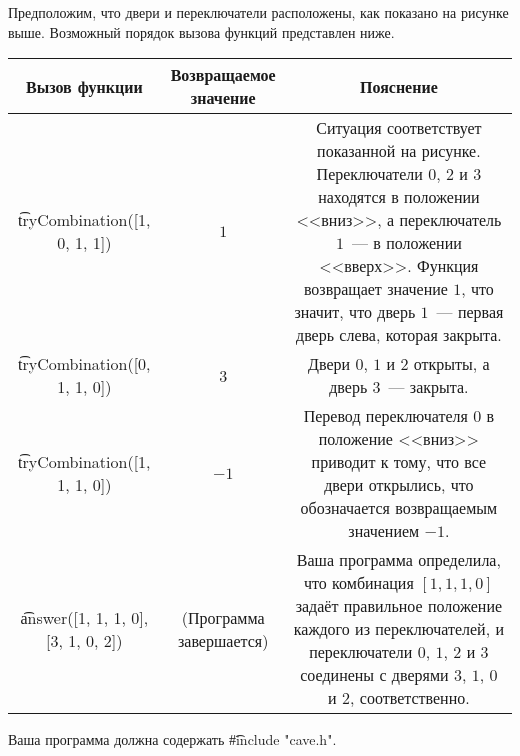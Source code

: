 Предположим, что двери и переключатели расположены, как показано на рисунке выше. Возможный порядок вызова функций представлен ниже.
\begin{center}
\renewcommand{\arraystretch}{2.2}
\begin{tabular}{ |c|c|c| }
\hline
Вызов функции & \parbox{3cm}{\centering \vspace{2mm}Возвращаемое значение\\\vspace{2mm}} & Пояснение\\
\hline
\t{tryCombination([1, 0, 1, 1])} & $1$ & \parbox{7cm}{\centering \vspace{2mm}Ситуация соответствует показанной на рисунке. Переключатели $0$, $2$ и $3$ находятся в положении <<вниз>>, а переключатель $1$~--- в положении <<вверх>>. Функция возвращает значение $1$, что значит, что дверь $1$~--- первая дверь слева, которая закрыта.\\\vspace{2mm}}\\
\hline
\t{tryCombination([0, 1, 1, 0])} & 3 & \parbox{7cm}{\centering \vspace{2mm}Двери $0$, $1$ и $2$ открыты, а дверь $3$~--- закрыта.\\\vspace{2mm}}\\
\hline
\t{tryCombination([1, ­1, 1, 0])} & $-1$ & \parbox{7cm}{\centering \vspace{2mm}Перевод переключателя $0$ в положение <<вниз>> приводит к тому, что все двери открылись, что обозначается возвращаемым значением ­$-1$.\\\vspace{2mm}}\\
\hline
\t{answer([1, 1, 1, 0],[3, 1, 0, 2])} & \parbox{3cm}{\centering \vspace{2mm}(Программа завершается)\\\vspace{2mm}} & \parbox{7cm}{\centering \vspace{2mm}Ваша программа определила, что комбинация $[1,1, 1,0]$ задаёт правильное положение каждого из переключателей, и переключатели $0$, $1$, $2$ и $3$ соединены с дверями $3$, $1$, $0$ и $2$, соответственно.\\\vspace{2mm}}\\
\hline
\end{tabular}
\end{center}
Ваша программа должна содержать \t{\#include "cave.h"}.